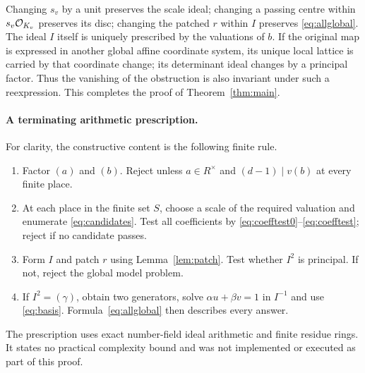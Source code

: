 Changing $s_v$ by a unit preserves the scale ideal; changing a passing
centre within $s_v\mathcal O_{K_v}$ preserves its disc; changing the patched
$r$ within $I$ preserves \eqref{eq:allglobal}. The ideal $I$ itself
is uniquely prescribed by the valuations of $b$. If the original
map is expressed in another global affine coordinate system, its
unique local lattice is carried by that coordinate change; its
determinant ideal changes by a principal factor. Thus the vanishing
of the obstruction is also invariant under such a reexpression.
This completes the proof of Theorem~\ref{thm:main}.

\paragraph{A terminating arithmetic prescription.}
For clarity, the constructive content is the following finite rule.
\begin{enumerate}
\item Factor $(a)$ and $(b)$. Reject unless $a\in R^\times$ and
$(d-1)\mid v(b)$ at every finite place.
\item At each place in the finite set $S$, choose a scale of the
required valuation and enumerate \eqref{eq:candidates}. Test all
coefficients by \eqref{eq:coefftest0}--\eqref{eq:coefftest}; reject
if no candidate passes.
\item Form $I$ and patch $r$ using Lemma~\ref{lem:patch}. Test
whether $I^2$ is principal. If not, reject the global model problem.
\item If $I^2=(\gamma)$, obtain two generators, solve
$\alpha u+\beta v=1$ in $I^{-1}$ and use \eqref{eq:basis}.
Formula~\eqref{eq:allglobal} then describes every answer.
\end{enumerate}
The prescription uses exact number-field ideal arithmetic and finite
residue rings. It states no practical complexity bound and was not
implemented or executed as part of this proof.
